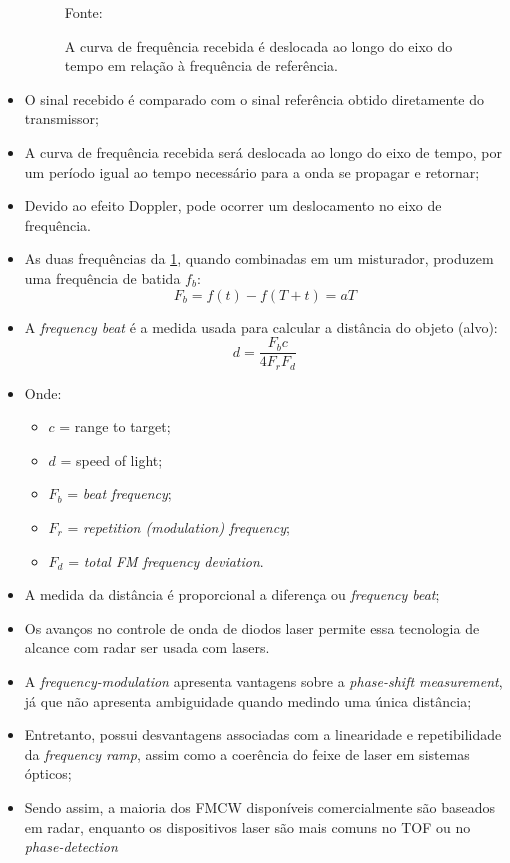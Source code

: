 \documentclass[xcolor=dvipsnames, aspectratio=169]{beamer}
\begin{document}
\begin{frame}
\begin{itemize}
\begin{figure}
            {Fonte: \cite{everett1995sensors}}
            \caption{A curva de frequência recebida é deslocada ao longo do eixo do tempo em relação à frequência de referência.}
            \label{fig:curva_de_freq}
        \end{figure}
        \item O sinal recebido é comparado com o sinal referência obtido diretamente do transmissor;
        \item A curva de frequência recebida será deslocada ao longo do eixo de tempo, por um período igual ao tempo necessário para a onda se propagar e retornar;
        \item Devido ao efeito Doppler, pode ocorrer um deslocamento no eixo de frequência.
        \item As duas frequências da \ref{fig:curva_de_freq}, quando combinadas em um misturador, produzem uma frequência de batida $f_{b}$:
        \begin{equation}
            F_{b} = f(t) - f(T + t) = aT
        \end{equation}
        \item A \textit{frequency beat} é a medida usada para calcular a distância do objeto (alvo):
        \begin{equation}
            d = \frac{F_{b}c}{4F_{r}F{_d}}
        \end{equation}
        \item Onde:
        \begin{itemize}
            \item[] $c$ = range to target;
            \item[] $d$ = speed of light;
            \item[] $F_{b}$ = \textit{beat frequency};
            \item[] $F_{r}$ = \textit{repetition (modulation) frequency};
            \item[] $F_{d}$ = \textit{total FM frequency deviation}.
        \end{itemize}
        \item A medida da distância é proporcional a diferença ou \textit{frequency beat};
        \item Os avanços no controle de onda de diodos laser permite essa tecnologia de alcance com radar ser usada com lasers.
        \item A \textit{frequency-modulation} apresenta vantagens sobre a \textit{phase-shift measurement}, já que não apresenta ambiguidade quando medindo uma única distância;
        \item Entretanto, possui desvantagens associadas com a linearidade e repetibilidade da \textit{frequency ramp}, assim como a coerência do feixe de laser em sistemas ópticos;
        \item Sendo assim, a maioria dos FMCW disponíveis comercialmente são baseados em radar, enquanto os dispositivos laser são mais comuns no TOF ou no \textit{phase-detection}
	\end{itemize}
\end{frame}
\end{document}
